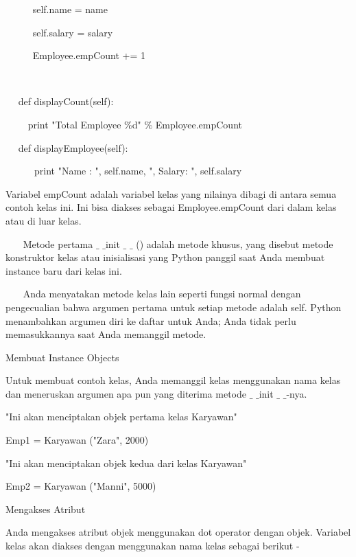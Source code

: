~~~~~ self.name = name \par
~~~~~ self.salary = salary \par
~~~~~ Employee.empCount += 1 \par
~~  \par
~~ def displayCount(self): \par
~~~~ print "Total Employee  $  \%  $d"  $  \%  $ Employee.empCount \par
\vspace{12pt}
~~ def displayEmployee(self): \par
~~~~~~print "Name : ", self.name,  ", Salary: ", self.salary \par
\vspace{12pt}
Variabel empCount adalah variabel kelas yang nilainya dibagi di antara semua contoh kelas ini. Ini bisa diakses sebagai Employee.empCount dari dalam kelas atau di luar kelas. \par
\vspace{12pt}
~~~ Metode pertama  $  \_  $ $  \_  $init  $  \_  $ $  \_  $ () adalah metode khusus, yang disebut metode konstruktor kelas atau inisialisasi yang Python panggil saat Anda membuat instance baru dari kelas ini. \par
\vspace{12pt}
~~~ Anda menyatakan metode kelas lain seperti fungsi normal dengan pengecualian bahwa argumen pertama untuk setiap metode adalah self. Python menambahkan argumen diri ke daftar untuk Anda; Anda tidak perlu memasukkannya saat Anda memanggil metode. \par
\vspace{12pt}
Membuat Instance Objects \par
\vspace{12pt}
Untuk membuat contoh kelas, Anda memanggil kelas menggunakan nama kelas dan meneruskan argumen apa pun yang diterima metode  $  \_  $ $  \_  $init $  \_  $ $  \_  $-nya. \par
\vspace{12pt}
"Ini akan menciptakan objek pertama kelas Karyawan" \par
Emp1 = Karyawan ("Zara", 2000) \par
"Ini akan menciptakan objek kedua dari kelas Karyawan" \par
Emp2 = Karyawan ("Manni", 5000) \par
\vspace{12pt}
Mengakses Atribut \par
\vspace{12pt}
Anda mengakses atribut objek menggunakan dot operator dengan objek. Variabel kelas akan diakses dengan menggunakan nama kelas sebagai berikut - \par
